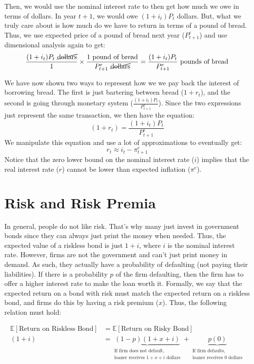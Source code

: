 \documentclass{extarticle}
\begin{document}
Then, we would use the nominal interest rate to then get how much we owe in terms of dollars. In year $t+1$, we would owe $(1 + i_t)P_t$ dollars. 
But, what we truly care about is how much do we have to return in terms of a pound of bread. 
Thus, we use expected price of a pound of bread next year ($P^e_{t+1}$) and use dimensional analysis again to get:
$$\frac{(1+i_t) P_t \text{ } \cancel{\text{dollars}}}{1} \times \frac{1 \text{ pound of bread}}{P^e_{t+1} \text{ } \cancel{\text{dollars}}} = \frac{(1+i_t)P_t}{P^e_{t+1}} \text{ pounds of bread}$$

We have now shown two ways to represent how we we pay back the interest of borrowing bread. The first is just bartering between bread ($1+r_t$), and the second is going through monetary system ($\frac{(1+i_t)P_t}{P^e_{t+1}}$). Since the two expressions just represent the same transaction, we then have the equation:
$$(1+r_t) = \frac{(1+i_t)P_t}{P^e_{t+1}}$$
We manipulate this equation and use a lot of approximations to eventually get:
$$r_t \approx i_t - \pi^e_{t+1}$$
Notice that the zero lower bound on the nominal interest rate ($i$) implies that the real interest rate ($r$) cannot be lower than expected inflation ($\pi^e$).

\section{Risk and Risk Premia}
In general, people do not like risk. That's why many just invest in government bonds since they can always just print the money when needed. Thus, the expected value of a riskless bond is just $1+i$, where $i$ is the nominal interest rate. However, firms are not the government and can't just print money in demand. As such, they actually have a probability of defaulting (not paying their liabilities). If there is a probability $p$ of the firm defaulting, then the firm has to offer a higher interest rate to make the loan worth it. Formally, we say that the expected return on a bond with risk must match the expected return on a riskless bond, and firms do this by having a risk premium ($x$). Thus, the following relation must hold:

\begin{align*}
  \mathbb{E}[\text{Return on Riskless Bond}] &= \mathbb{E}[\text{Return on Risky Bond}] \\
  (1+i) &= \underbrace{(1-p)(1+x+i)}_{\substack{\text{If firm does not default,}\\ \text{loaner receives $1+x+i$ dollars}}} + \underbrace{p(0)}_{\substack{\text{If firm defaults,}\\ \text{loaner receives 0 dollars}}}
\end{align*}
\end{document}
